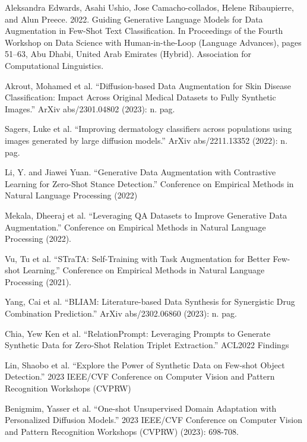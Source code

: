 \documentclass[preprint,12pt,authoryear]{elsarticle}
\begin{document}
\begin{thebibliography}{00}
Aleksandra Edwards, Asahi Ushio, Jose Camacho-collados, Helene Ribaupierre, and Alun Preece. 2022. Guiding Generative Language Models for Data Augmentation in Few-Shot Text Classification. In Proceedings of the Fourth Workshop on Data Science with Human-in-the-Loop (Language Advances), pages 51–63, Abu Dhabi, United Arab Emirates (Hybrid). Association for Computational Linguistics.

Akrout, Mohamed et al. “Diffusion-based Data Augmentation for Skin Disease Classification: Impact Across Original Medical Datasets to Fully Synthetic Images.” ArXiv abs/2301.04802 (2023): n. pag.


Sagers, Luke et al. “Improving dermatology classifiers across populations using images generated by large diffusion models.” ArXiv abs/2211.13352 (2022): n. pag.

Li, Y. and Jiawei Yuan. “Generative Data Augmentation with Contrastive Learning for Zero-Shot Stance Detection.” Conference on Empirical Methods in Natural Language Processing (2022)


Mekala, Dheeraj et al. “Leveraging QA Datasets to Improve Generative Data Augmentation.” Conference on Empirical Methods in Natural Language Processing (2022).

Vu, Tu et al. “STraTA: Self-Training with Task Augmentation for Better Few-shot Learning.” Conference on Empirical Methods in Natural Language Processing (2021).

Yang, Cai et al. “BLIAM: Literature-based Data Synthesis for Synergistic Drug Combination Prediction.” ArXiv abs/2302.06860 (2023): n. pag.

Chia, Yew Ken et al. “RelationPrompt: Leveraging Prompts to Generate Synthetic Data for Zero-Shot Relation Triplet Extraction.” ACL2022 Findings

Lin, Shaobo et al. “Explore the Power of Synthetic Data on Few-shot Object Detection.” 2023 IEEE/CVF Conference on Computer Vision and Pattern Recognition Workshops (CVPRW)

Benigmim, Yasser et al. “One-shot Unsupervised Domain Adaptation with Personalized Diffusion Models.” 2023 IEEE/CVF Conference on Computer Vision and Pattern Recognition Workshops (CVPRW) (2023): 698-708.


\end{thebibliography}
\end{document}
